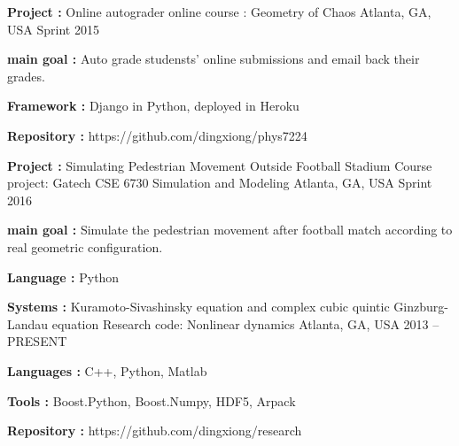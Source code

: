 \begin{cventries}
\cventry
{\textbf{Project :} Online autograder} 
{online course : Geometry of Chaos} 
{Atlanta, GA, USA} %
{Sprint 2015} %
{
  \begin{cvitems}
  \item {\textbf{main goal :} Auto grade studensts' online submissions and email back their grades.}
  \item {\textbf{Framework :} Django in Python, deployed in Heroku}
  \item {\textbf{Repository :} {\color{red} https://github.com/dingxiong/phys7224} }
  \end{cvitems}
}

\cventry
{\textbf{Project :} Simulating Pedestrian Movement Outside Football Stadium} 
{Course project: Gatech CSE 6730 Simulation and Modeling} 
{Atlanta, GA, USA} %
{Sprint 2016} %
{
  \begin{cvitems}
  \item {\textbf{main goal :} Simulate the pedestrian movement after football match according to real
      geometric configuration.}
  \item {\textbf{Language :} Python }
  \end{cvitems}
}

\cventry
{\textbf{Systems : } Kuramoto-Sivashinsky equation and complex cubic quintic Ginzburg-Landau equation} 
{Research code: Nonlinear dynamics} 
{Atlanta, GA, USA} %
{2013 -- PRESENT} %
{
  \begin{cvitems}
  \item {\textbf{Languages :} C++, Python, Matlab}
  \item {\textbf{Tools :} Boost.Python, Boost.Numpy, HDF5, Arpack}
  \item {\textbf{Repository :} {\color{red} https://github.com/dingxiong/research}}
  \end{cvitems}
}





\end{cventries}